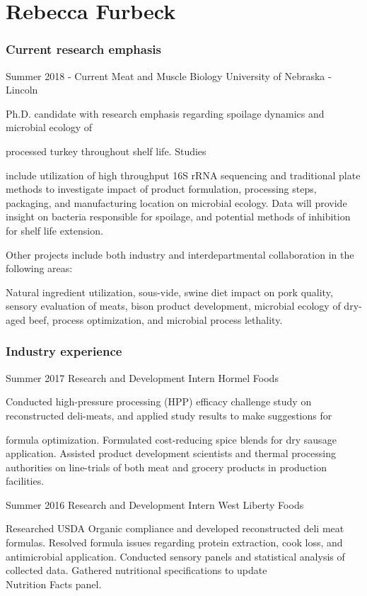 \documentclass{tccv}
\begin{document}
\part{Rebecca Furbeck}
\begin{eventlist}
\section{Current research emphasis}
\item{Summer 2018 - Current}
     {Meat and Muscle Biology}
     {University of Nebraska - Lincoln}

Ph.D. candidate with research emphasis
regarding spoilage dynamics and microbial
ecology of

processed turkey throughout shelf life.
Studies

include utilization of high throughput 16S rRNA
sequencing and traditional plate methods to
investigate impact of product formulation,
processing steps, packaging, and manufacturing location on microbial ecology. Data will provide insight on bacteria responsible for spoilage, and potential methods of inhibition for shelf life extension.

\vspace{2mm}
Other projects include both industry and interdepartmental collaboration in the following areas:

Natural ingredient utilization, sous-vide,  swine diet impact on pork quality, sensory evaluation of meats, bison product development, microbial ecology of dry-aged beef, process optimization, and microbial process lethality.


\section{Industry experience}
\item{Summer 2017}
     {Research and Development Intern}
     {Hormel Foods}

Conducted high-pressure processing (HPP) efficacy challenge study on reconstructed deli-meats, and applied study results to make suggestions for

formula optimization. Formulated cost-reducing spice blends for dry sausage application. Assisted product development scientists and thermal processing authorities on line-trials of both meat and grocery products in production facilities.

\item{Summer 2016}
     {Research and Development Intern}
     {West Liberty Foods}

Researched USDA Organic compliance and
developed reconstructed deli meat formulas.
Resolved formula issues regarding protein
extraction, cook loss, and antimicrobial application. Conducted sensory panels and statistical analysis of collected data. Gathered nutritional specifications to update \\Nutrition Facts panel.
\end{eventlist}
\end{document}
